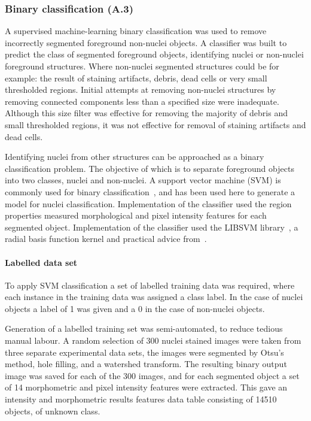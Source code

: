 \subsubsection{Binary classification (A.3)}
A supervised machine-learning binary classification was used to remove incorrectly segmented foreground non-nuclei objects. A classifier was built to predict the class of segmented foreground objects, identifying nuclei or non-nuclei foreground structures. Where non-nuclei segmented structures could be for example: the result of staining artifacts, debris, dead cells or very small thresholded regions. Initial attempts at removing non-nuclei structures by removing connected components less than a specified size were inadequate. Although this size filter was effective for removing the majority of debris and small thresholded regions, it was not effective for removal of staining artifacts and dead cells.

Identifying nuclei from other structures can be approached as a binary classification problem. The objective of which is to separate foreground objects into two classes, nuclei and non-nuclei. A support vector machine (SVM) is commonly used for binary classification~\cite{Cortes1995}, and has been used here to generate a model for nuclei classification. Implementation of the classifier used the region properties measured morphological and pixel intensity features for each segmented object. Implementation of the classifier used the LIBSVM library~\cite{Chang2011}, a radial basis function kernel and practical advice from~\cite{Hsu2008}.

\paragraph{Labelled data set}
To apply SVM classification a set of labelled training data was required, where each instance in the training data was assigned a class label. In the case of nuclei objects a label of 1 was given and a 0 in the case of non-nuclei objects.

Generation of a labelled training set was semi-automated, to reduce tedious manual labour. A random selection of 300 nuclei stained images were taken from three separate experimental data sets, the images were segmented by Otsu's method, hole filling, and a watershed transform. The resulting binary output image was saved for each of the 300 images, and for each segmented object a set of 14 morphometric and pixel intensity features were extracted. This gave an intensity and morphometric results features data table consisting of 14510 objects, of unknown class.

